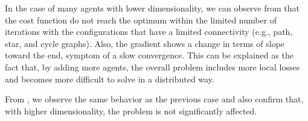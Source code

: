 \documentclass[a4paper,11pt,oneside]{book}
\begin{document}
In the case of many agents with lower dimensionality, we can observe from  that the cost function do not reach the optimum within the limited number of iterations with the configurations that have a limited connectivity (e.g., path, star, and cycle graphs). Also, the gradient shows a change in terms of slope toward the end, symptom of a slow convergence. This can be explained as the fact that, by adding more agents, the overall problem includes more local losses and becomes more difficult to solve in a distributed way.

From , we observe the same behavior as the previous case and also confirm that, with higher dimensionality, the problem is not significantly affected.



\end{document}
